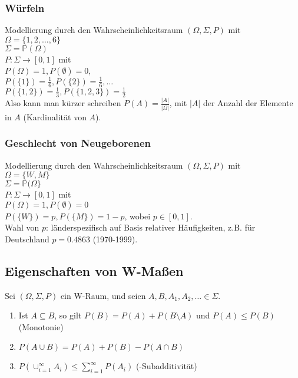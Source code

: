 \subsubsection{Würfeln}
Modellierung durch den Wahrscheinlichkeitsraum $(\Omega, \Sigma, P)$ mit\\
$\Omega = \{1,2,\dots,6\}$\\
$\Sigma =\mathbb{P}(\Omega)$\\
$P: \Sigma \to [0,1]$ mit\\
$P(\Omega) = 1, P(\emptyset) = 0$,\\
$P(\{1\})=\frac{1}{6}, P(\{2\})=\frac{1}{6}, \dots$\\
$P(\{1, 2\})=\frac{1}{3}, P(\{1,2,3\})=\frac{1}{2}$\\
Also kann man kürzer schreiben $P(A) = \frac{|A|}{|\Omega|}$, mit $|A|$ der Anzahl der Elemente in $A$
(Kardinalität von $A$).

\subsubsection{Geschlecht von Neugeborenen}
Modellierung durch den Wahrscheinlichkeitsraum $(\Omega, \Sigma, P)$ mit\\
$\Omega = \{W,M\}$\\
$\Sigma = \mathbb{P}(\Omega\}$\\
$P: \Sigma \to [0,1]$ mit\\
$P(\Omega) = 1, P(\emptyset)=0$\\
$P(\{W\}) = p, P(\{M\}) = 1-p$, wobei $p \in [0,1]$.\\
Wahl von $p$: länderspezifisch auf Basis relativer Häufigkeiten, z.B. für Deutschland $p=0.4863$ (1970-1999).

\subsection{Eigenschaften von W-Maßen}
\begin{theorem}
    Sei $(\Omega, \Sigma, P)$ ein W-Raum, und seien $A, B, A_1, A_2, \dots \in \Sigma$.
    \begin{enumerate}
        \item Ist $A \subseteq B$, so gilt $P(B) = P(A) + P(B\setminus A)$ und
            $P(A) \leq P(B)$ (Monotonie)
        \item $P(A \cup B) = P(A) + P(B) - P(A\cap B)$
        \item $P\left(\cup_{i=1}^\infty A_i\right) \leq \sum_{i=1}^\infty P(A_i)$ (\ts-Subadditivität)
    \end{enumerate}
\end{theorem}



